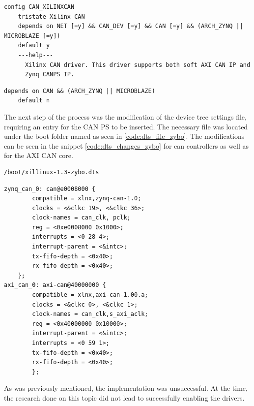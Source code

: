 \begin{lstlisting}[firstnumber=128,caption={Kconfig file contents from line 128.},label=code:can_kconfig_contents128]
config CAN_XILINXCAN
	tristate Xilinx CAN
	depends on NET [=y] && CAN_DEV [=y] && CAN [=y] && (ARCH_ZYNQ || MICROBLAZE [=y])
	default y
	---help---
	  Xilinx CAN driver. This driver supports both soft AXI CAN IP and
	  Zynq CANPS IP.
\end{lstlisting}

\begin{lstlisting}[firstnumber=130,caption={Original content of lines 130 and 131.},label=code:can_kconfig_original_line130]
	depends on CAN && (ARCH_ZYNQ || MICROBLAZE)
	default n
\end{lstlisting}

The next step of the process was the modification of the device tree settings file, requiring an entry for the CAN PS to be inserted.
The necessary file was located under the boot folder named as seen in \ref{code:dts_file_zybo}.
The modifications can be seen in the snippet \ref{code:dts_changes_zybo} for can controllers as well as for the AXI CAN core.

\begin{lstlisting}[numbers=none,caption={Device tree settings file and its path.},label=code:dts_file_zybo]
/boot/xillinux-1.3-zybo.dts
\end{lstlisting}
\begin{lstlisting}[caption={Device tree settings changes.},label=code:dts_changes_zybo]
zynq_can_0: can@e0008000 {
        compatible = xlnx,zynq-can-1.0;
        clocks = <&clkc 19>, <&clkc 36>;
        clock-names = can_clk, pclk;
        reg = <0xe0008000 0x1000>;
        interrupts = <0 28 4>;
        interrupt-parent = <&intc>;
        tx-fifo-depth = <0x40>;
        rx-fifo-depth = <0x40>;
    };
axi_can_0: axi-can@40000000 {
        compatible = xlnx,axi-can-1.00.a;
        clocks = <&clkc 0>, <&clkc 1>;
        clock-names = can_clk,s_axi_aclk;
        reg = <0x40000000 0x10000>;
        interrupt-parent = <&intc>;
        interrupts = <0 59 1>;
        tx-fifo-depth = <0x40>;
        rx-fifo-depth = <0x40>;
        };
\end{lstlisting}

As was previously mentioned, the implementation was unsuccessful. At the time, the research done on this topic did not lead to successfully enabling the drivers.

